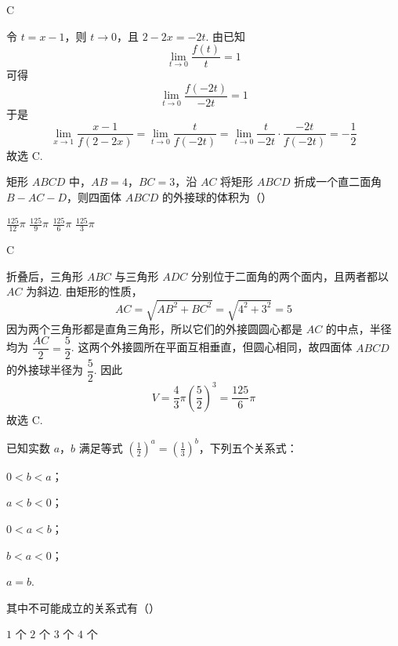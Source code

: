 \begin{answer}C\end{answer}

\begin{solution}
令 \(t=x-1\)，则 \(t\to0\)，且 \(2-2x=-2t\). 由已知
\[
\lim_{t\to0}\frac{f(t)}{t}=1
\]
可得
\[
\lim_{t\to0}\frac{f(-2t)}{-2t}=1
\]
于是
\[
\lim_{x\to1}\frac{x-1}{f(2-2x)}
=\lim_{t\to0}\frac{t}{f(-2t)}
=\lim_{t\to0}\frac{t}{-2t}\cdot\frac{-2t}{f(-2t)}
=-\frac12
\]
故选 C.
\end{solution}

\begin{problem}
矩形 \(ABCD\) 中，\(AB=4\)，\(BC=3\)，沿 \(AC\) 将矩形 \(ABCD\) 折成一个直二面角 \(B-AC-D\)，则四面体 \(ABCD\) 的外接球的体积为（\quad）

\choices
    {\(\frac{125}{12}\pi\)}
    {\(\frac{125}{9}\pi\)}
    {\(\frac{125}{6}\pi\)}
    {\(\frac{125}{3}\pi\)}
\end{problem}

\begin{answer}C\end{answer}

\begin{solution}
折叠后，三角形 \(ABC\) 与三角形 \(ADC\) 分别位于二面角的两个面内，且两者都以 \(AC\) 为斜边. 由矩形的性质，
\[
AC=\sqrt{AB^{2}+BC^{2}}=\sqrt{4^{2}+3^{2}}=5
\]
因为两个三角形都是直角三角形，所以它们的外接圆圆心都是 \(AC\) 的中点，半径均为 \(\dfrac{AC}{2}=\dfrac52\). 这两个外接圆所在平面互相垂直，但圆心相同，故四面体 \(ABCD\) 的外接球半径为 \(\dfrac52\). 因此
\[
V=\frac43\pi\left(\frac52\right)^3=\frac{125}{6}\pi
\]
故选 C.
\end{solution}

\begin{problem}
已知实数 \(a\)，\(b\) 满足等式 \(\left(\frac{1}{2}\right)^a=\left(\frac{1}{3}\right)^b\)，下列五个关系式：

\begin{circlelist}
\item \(0<b<a\)；
\item \(a<b<0\)；
\item \(0<a<b\)；
\item \(b<a<0\)；
\item \(a=b\).
\end{circlelist}

其中不可能成立的关系式有（\quad）

\choices
    {\(1\) 个}
    {\(2\) 个}
    {\(3\) 个}
    {\(4\) 个}
\end{problem}

